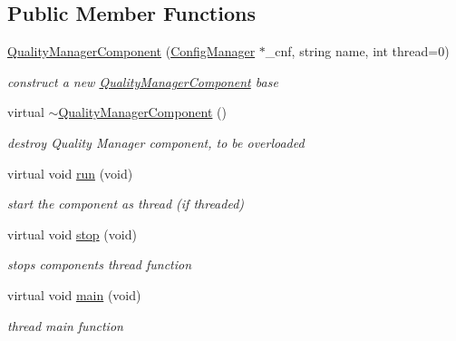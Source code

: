 \subsection*{Public Member Functions}
\begin{DoxyCompactItemize}
\item 
\hyperlink{classQualityManagerComponent_aa4185d8564d0ef37f12e2564a49aa727}{Quality\+Manager\+Component} (\hyperlink{classConfigManager}{Config\+Manager} $\ast$\+\_\+cnf, string name, int thread=0)
\begin{DoxyCompactList}\small\item\em construct a new \hyperlink{classQualityManagerComponent}{Quality\+Manager\+Component} base \end{DoxyCompactList}\item 
\mbox{\label{classQualityManagerComponent_a557542f7a34876dd43d09f9198942ee5}} 
virtual \hyperlink{classQualityManagerComponent_a557542f7a34876dd43d09f9198942ee5}{$\sim$\+Quality\+Manager\+Component} ()
\begin{DoxyCompactList}\small\item\em destroy Quality Manager component, to be overloaded \end{DoxyCompactList}\item 
virtual void \hyperlink{classQualityManagerComponent_ac3b9205c9c702674ae1967b218bb000b}{run} (void)
\begin{DoxyCompactList}\small\item\em start the component as thread (if threaded) \end{DoxyCompactList}\item 
\mbox{\label{classQualityManagerComponent_a2c35bd46ba19be778b6670769727d7f6}} 
virtual void \hyperlink{classQualityManagerComponent_a2c35bd46ba19be778b6670769727d7f6}{stop} (void)
\begin{DoxyCompactList}\small\item\em stops components thread function \end{DoxyCompactList}\item 
\mbox{\label{classQualityManagerComponent_aa016c0b84e52088712e95c59c0e3689c}} 
virtual void \hyperlink{classQualityManagerComponent_aa016c0b84e52088712e95c59c0e3689c}{main} (void)
\begin{DoxyCompactList}\small\item\em thread main function \end{DoxyCompactList}\item 

\end{DoxyCompactItemize}
